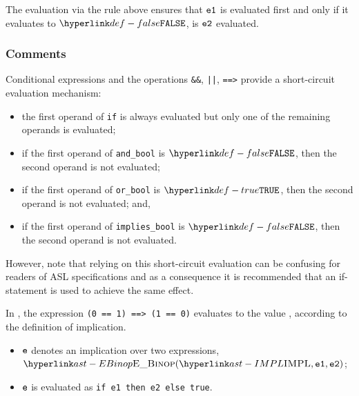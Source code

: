 \FormallyParagraph
\begin{mathpar}
\end{mathpar}

The evaluation via the rule above ensures that $\veone$ is evaluated first and only if
it evaluates to $\False$, is $\vetwo$ evaluated.

\subsubsection{Comments}

Conditional expressions and the operations \texttt{\&\&}, \texttt{||},
\texttt{==>} provide a short-circuit evaluation mechanism:

\begin{itemize}
\item the first operand of \texttt{if} is always evaluated but only one of the
remaining operands is evaluated;
\item if the first operand of \texttt{and\_bool} is $\False$, then the second operand is not evaluated;
\item if the first operand of \texttt{or\_bool} is $\True$, then the second operand is not evaluated; and,
\item if the first operand of \texttt{implies\_bool} is $\False$, then the
second operand is not evaluated.
\end{itemize}

However, note that relying on this short-circuit evaluation can be confusing
for readers of ASL specifications and as a consequence it is recommended that
an if-statement is used to achieve the same effect.

In ,
the expression \texttt{(0 == 1) ==> (1 == 0)} evaluates to the value \True, according to the definition of implication.

\ProseParagraph
\AllApply
\begin{itemize}
  \item $\ve$ denotes an implication over two expressions, $\EBinop(\IMPL, \veone, \vetwo)$;
  \item $\ve$ is evaluated as \texttt{if e1 then e2 else true}.
\end{itemize}

